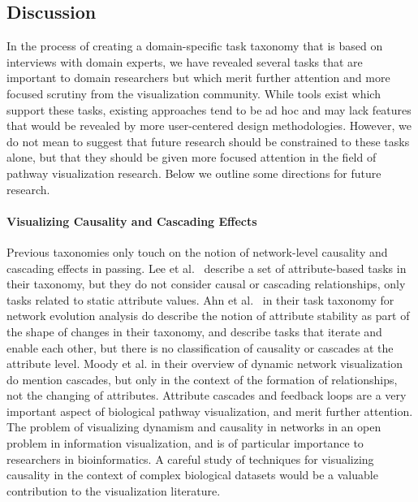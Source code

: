 \documentclass[twocolumn]{bmcart}%
\begin{document}
\subsection*{Discussion}

In the process of creating a domain-specific task taxonomy that is based on interviews with domain experts, we have revealed several tasks that are important to domain researchers but which merit further attention and more focused scrutiny from the visualization community.
While tools exist which support these tasks, existing approaches tend to be ad hoc and may lack features that would be revealed by more user-centered design methodologies.
However, we do not mean to suggest that future research should be constrained to these tasks alone, but that they should be given more focused attention in the field of pathway visualization research. Below we outline some directions for future research.


\paragraph{Visualizing Causality and Cascading Effects}

Previous taxonomies only touch on the notion of network-level causality and cascading effects in passing.
Lee et al.~\cite{Lee2006} describe a set of attribute-based tasks in their taxonomy, but they do not consider causal or cascading relationships, only tasks related to static attribute values.
Ahn et al.~\cite{Ahn2014} in their task taxonomy for network evolution analysis do describe the notion of attribute stability as part of the shape of changes in their taxonomy, and describe tasks that iterate and enable each other, but there is no classification of causality or cascades at the attribute level.
Moody et al. in their overview of dynamic network visualization~\cite{moody2005dynamic} do mention cascades, but only in the context of the formation of relationships, not the changing of attributes.
Attribute cascades and feedback loops are a very important aspect of biological pathway visualization, and merit further attention.
The problem of visualizing dynamism and causality in networks in an open problem in information visualization, and is of particular importance to researchers in bioinformatics.
A careful study of techniques for visualizing causality in the context of complex biological datasets would be a valuable contribution to the visualization literature.
\end{document}
